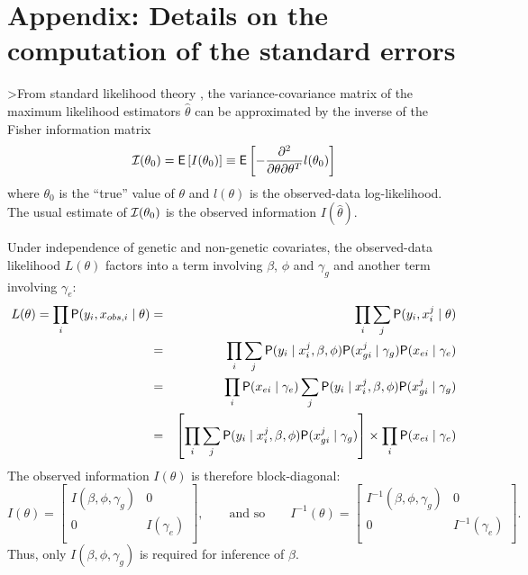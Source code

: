 \documentclass[article, shortnames]{jss}
\begin{document}
 

\section*{Appendix: Details on the computation of the standard errors}

>From standard likelihood theory
\citep[e.g.][]{McCullaghNelder83}, 
the variance-covariance
matrix of the maximum likelihood estimators $\widehat{\theta}$
can be approximated by
the inverse of the Fisher information matrix
$$ {\cal I}(\theta_0) = \mathsf{E}\left[ I(\theta_0) \right]
\equiv \mathsf{E}\left[ - \frac{\partial^2}{\partial \theta \partial \theta^T}
l(\theta_0) \right] $$
where $\theta_0$ is the ``true'' value of $\theta$ and $l(\theta)$ is
the observed-data log-likelihood. The usual estimate of
$ {\cal I}(\theta_0)$ is the observed information $I(\widehat{\theta})$.

Under independence of genetic and non-genetic covariates,
the observed-data likelihood
$L(\theta)$ factors into a term
involving $\beta$, $\phi$ and $\gamma_g$ and another term involving
$\gamma_e$:
\begin{eqnarray*}
L(\theta)  =  \prod_i \mathsf{P}(y_i , x_{obs,i} \mid \theta)
& = & \prod_i \sum_j  \mathsf{P}(y_i , x^j_i \mid \theta) \\
& = & \prod_i \sum_j  \mathsf{P}(y_i \mid x^j_i, \beta, \phi)
      \mathsf{P}(x^j_{gi} \mid \gamma_g) \mathsf{P}(x_{ei} \mid \gamma_e)  \\
& = & \prod_i \mathsf{P}(x_{ei} \mid \gamma_e) \sum_j  
      \mathsf{P}(y_i \mid x^j_i, \beta,\phi)
      \mathsf{P}(x^j_{gi} \mid \gamma_g)  \\
& = & \left[ \prod_i \sum_j  \mathsf{P}(y_i \mid x^j_i, \beta,\phi)
      \mathsf{P}(x^j_{gi} \mid \gamma_g) \right] \times
      \prod_i \mathsf{P}(x_{ei} \mid \gamma_e)
\end{eqnarray*}
The observed information $I(\theta)$
is therefore block-diagonal:
$$
I(\theta) =
\left[ \begin{array}{ll} I(\beta,\phi,\gamma_g) & 0 \\
                                    0 & I(\gamma_e) \\
       \end{array} \right],
\qquad \mbox{and so}
\qquad
I^{-1}(\theta) =
\left[ \begin{array}{ll} I^{-1}(\beta,\phi,\gamma_g) & 0 \\
                                    0 & I^{-1}(\gamma_e) \\
       \end{array} \right].
$$
Thus, only $I(\beta,\phi,\gamma_g)$
is required for inference of $\beta$.
\end{document}
